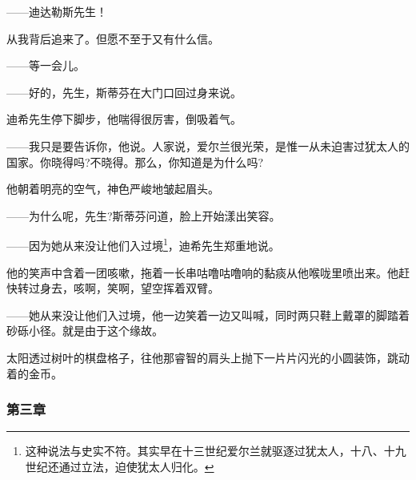 \par ——迪达勒斯先生！
\par 从我背后追来了。但愿不至于又有什么信。
\par ——等一会儿。
\par ——好的，先生，斯蒂芬在大门口回过身来说。
\par 迪希先生停下脚步，他喘得很厉害，倒吸着气。
\par ——我只是要告诉你，他说。人家说，爱尔兰很光荣，是惟一从未迫害过犹太人的国家。你晓得吗?不晓得。那么，你知道是为什么吗?
\par 他朝着明亮的空气，神色严峻地皱起眉头。
\par ——为什么呢，先生?斯蒂芬问道，脸上开始漾出笑容。
\par ——因为她从来没让他们入过境\footnote{这种说法与史实不符。其实早在十三世纪爱尔兰就驱逐过犹太人，十八、十九世纪还通过立法，迫使犹太人归化。}，迪希先生郑重地说。
\par 他的笑声中含着一团咳嗽，拖着一长串咕噜咕噜响的黏痰从他喉咙里喷出来。他赶快转过身去，咳啊，笑啊，望空挥着双臂。
\par ——她从来没让他们入过境，他一边笑着一边又叫喊，同时两只鞋上戴罩的脚踏着砂砾小径。就是由于这个缘故。
\par 太阳透过树叶的棋盘格子，往他那睿智的肩头上抛下一片片闪光的小圆装饰，跳动着的金币。








\subsubsection*{第三章}

